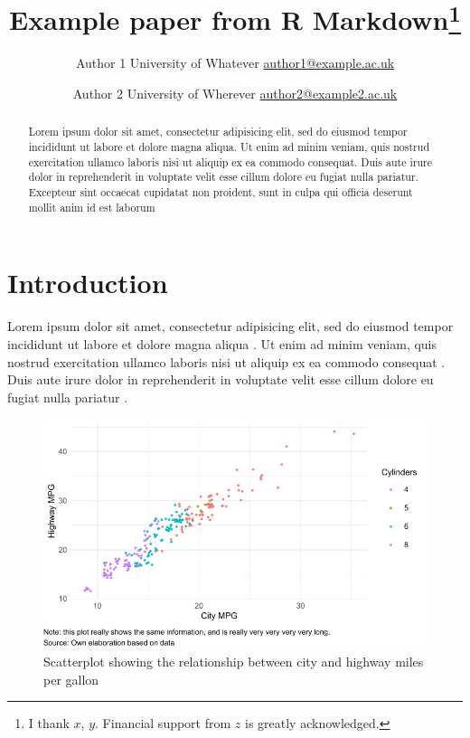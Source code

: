 \documentclass[11pt,article,oneside]{memoir}
\title{\bigskip \bigskip Example paper from R Markdown\thanks{I thank
\(x\), \(y\). Financial support from \(z\) is greatly acknowledged.}}
\author{
  \large Author 1 \newline
  \footnotesize University of Whatever \newline
  \footnotesize \url{author1@example.ac.uk}\vspace*{1.1em}\newline
    \and
  \large Author 2 \newline
  \footnotesize University of Wherever \newline
  \footnotesize \url{author2@example2.ac.uk}\vspace*{1.1em}\newline
  }
\date{}
\let\normalunderbracket=\underbracket
\let\normaloverbracket=\overbracket
\providecommand{\keywords}[1]{\small{\sffamily{\textbf{\textit{Keywords---}}#1 \vskip 3em}}}
\newcommand{\published}[1]{%
   \gdef\puB{#1}}
\newcommand{\puB}{}
\begin{document}
\let\underbracket=\normalunderbracket
\let\overbracket=\normaloverbracket

\pagestyle{athgit}

\published{\textbf{09 February, 2022} \qquad Working
paper. \\ {\tiny Access the code at
\url{https://github.com/ygalanak/DataAnalysisTemplate}}}

\maketitle


\begin{abstract}
\noindent Lorem ipsum dolor sit amet, consectetur adipisicing elit, sed
do eiusmod tempor incididunt ut labore et dolore magna aliqua. Ut enim
ad minim veniam, quis nostrud exercitation ullamco laboris nisi ut
aliquip ex ea commodo consequat. Duis aute irure dolor in reprehenderit
in voluptate velit esse cillum dolore eu fugiat nulla pariatur.
Excepteur sint occaecat cupidatat non proident, sunt in culpa qui
officia deserunt mollit anim id est laborum
\bigskip
\end{abstract}

\keywords{k1; k2; k3}




\hypertarget{introduction}{%
\section{Introduction}\label{introduction}}

Lorem ipsum dolor sit amet, consectetur adipisicing elit, sed do eiusmod
tempor incididunt ut labore et dolore magna aliqua
\autocite{HeissKelley:2017}. Ut enim ad minim veniam, quis nostrud
exercitation ullamco laboris nisi ut aliquip ex ea commodo consequat
\autocite{KeckSikkink:1998}. Duis aute irure dolor in reprehenderit in
voluptate velit esse cillum dolore eu fugiat nulla pariatur
\autocite{Heiss:2019}.

\begin{figure}
\hypertarget{fig:mpg-plot}{%
\centering
\includegraphics{./figs-tbls/mpg-plot.pdf}
\caption{Scatterplot showing the relationship between city and highway
miles per gallon}\label{fig:mpg-plot}
}
\end{figure}
\end{document}
